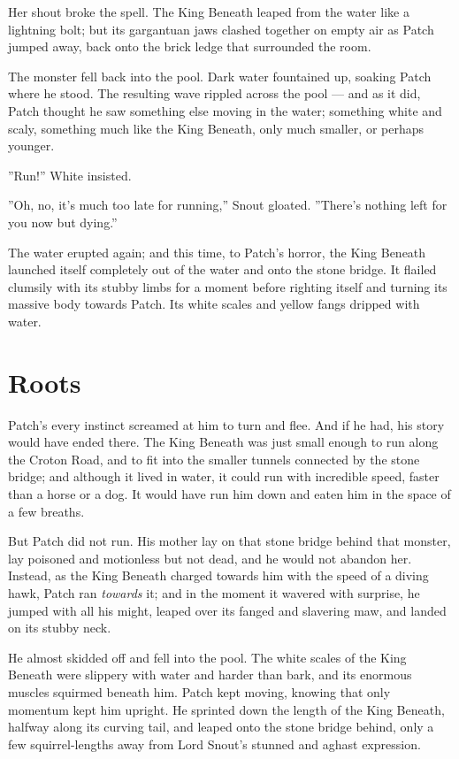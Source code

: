 \documentclass[12pt]{book}
\begin{document}
Her shout broke the spell. The King Beneath leaped from the water like a lightning bolt; but its gargantuan jaws clashed together on empty air as Patch jumped away, back onto the brick ledge that surrounded the room.

The monster fell back into the pool. Dark water fountained up, soaking Patch where he stood. The resulting wave rippled across the pool ---
and as it did, Patch thought he saw something else moving in the water; something white and scaly, something much like the King Beneath, only much smaller, or perhaps younger.

''Run!'' White insisted.

''Oh, no, it's much too late for running,'' Snout gloated. ''There's nothing left for you now but dying.''

The water erupted again; and this time, to Patch's horror, the King Beneath launched itself completely out of the water and onto the stone bridge. It flailed clumsily with its stubby limbs for a moment before righting itself and turning its massive body towards Patch. Its white scales and yellow fangs dripped with water.


\section{Roots}

Patch's every instinct screamed at him to turn and flee. And if he had, his story would have ended there. The King Beneath was just small enough to run along the Croton Road, and to fit into the smaller tunnels connected by the stone bridge; and although it lived in water, it could run with incredible speed, faster than a horse or a dog. It would have run him down and eaten him in the space of a few breaths.

But Patch did not run. His mother lay on that stone bridge behind that monster, lay poisoned and motionless but not dead, and he would not abandon her. Instead, as the King Beneath charged towards him with the speed of a diving hawk, Patch ran {\it towards} it; and in the moment it wavered with surprise, he jumped with all his might, leaped over its fanged and slavering maw, and landed on its stubby neck.

He almost skidded off and fell into the pool. The white scales of the King Beneath were slippery with water and harder than bark, and its enormous muscles squirmed beneath him. Patch kept moving, knowing that only momentum kept him upright. He sprinted down the length of the King Beneath, halfway along its curving tail, and leaped onto the stone bridge behind, only a few squirrel-lengths away from Lord Snout's stunned and aghast expression.
\end{document}
